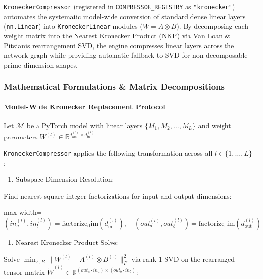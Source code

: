 \texttt{KroneckerCompressor} (registered in \texttt{COMPRESSOR\_REGISTRY} as \texttt{"kronecker"}) automates the systematic model-wide conversion of standard dense linear layers (\texttt{nn.Linear}) into \texttt{KroneckerLinear} modules ($W = A \otimes B$). By decomposing each weight matrix into the Nearest Kronecker Product (NKP) via Van Loan \& Pitsianis rearrangement SVD, the engine compresses linear layers across the network graph while providing automatic fallback to SVD for non-decomposable prime dimension shapes.


\subsubsection*{Mathematical Formulations \& Matrix Decompositions}

\paragraph{Model-Wide Kronecker Replacement Protocol}
Let $\mathcal{M}$ be a PyTorch model with linear layers $\{M_1, M_2, \dots, M_L\}$ and weight parameters $W^{(l)} \in \mathbb{R}^{d_{\text{out}}^{(l)} \times d_{\text{in}}^{(l)}}$.

\texttt{KroneckerCompressor} applies the following transformation across all $l \in \{1, \dots, L\}$:

\begin{enumerate}
\item Subspace Dimension Resolution:
\end{enumerate}
Find nearest-square integer factorizations for input and output dimensions:

\begin{center}
\begin{adjustbox}{max width=\columnwidth}
$\displaystyle
(in_a^{(l)}, in_b^{(l)}) = \operatorname{factorize_dim}(d_{\text{in}}^{(l)}), \quad (out_a^{(l)}, out_b^{(l)}) = \operatorname{factorize_dim}(d_{\text{out}}^{(l)})
$
\end{adjustbox}
\end{center}

\begin{enumerate}
\item Nearest Kronecker Product Solve:
\end{enumerate}
Solve $\min_{A, B} \|W^{(l)} - A^{(l)} \otimes B^{(l)}\|_F^2$ via rank-1 SVD on the rearranged tensor matrix $\widetilde{W}^{(l)} \in \mathbb{R}^{(out_a \cdot in_a) \times (out_b \cdot in_b)}$:


